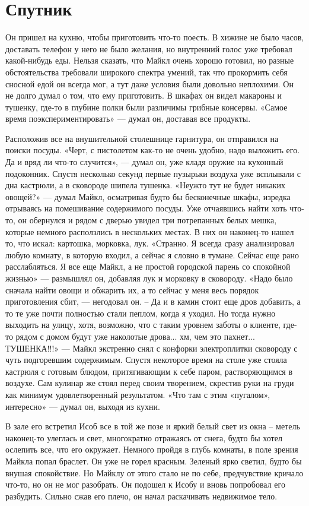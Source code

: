 \chapter{Спутник}
\lettrine{О}{}н пришел на кухню, чтобы приготовить что-то поесть. В хижине не было часов, доставать телефон у него не было желания, но внутренний голос уже требовал какой-нибудь еды. Нельзя сказать, что Майкл очень хорошо готовил, но разные обстоятельства требовали широкого спектра умений, так что прокормить себя сносной едой он всегда мог, а тут даже условия были довольно неплохими. Он не долго думал о том, что ему приготовить. В шкафах он видел макароны и тушенку, где-то в глубине полки были различимы грибные консервы. «Самое время поэкспериментировать» — думал он, доставая все продукты. 

Расположив все на внушительной столешнице гарнитура, он отправился на поиски посуды. «Черт, с пистолетом как-то не очень удобно, надо выложить его. Да и вряд ли что-то случится», — думал он, уже кладя оружие на кухонный подоконник. Спустя несколько секунд первые пузырьки воздуха уже всплывали с дна кастрюли, а в сковороде шипела тушенка. «Неужто тут не будет никаких овощей?» — думал Майкл, осматривая будто бы бесконечные шкафы, изредка отрываясь на помешивание содержимого посуды. Уже отчаявшись найти хоть что-то, он обернулся и рядом с дверью увидел три потрепанных белых мешка, которые немного расползлись в нескольких местах. В них он наконец-то нашел то, что искал: картошка, морковка, лук. «Странно. Я всегда сразу анализировал любую комнату, в которую входил, а сейчас я словно в тумане. Сейчас еще рано расслабляться. Я все еще Майкл, а не простой городской парень со спокойной жизнью» — размышлял он, добавляя лук и морковку в сковороду. «Надо было сначала найти овощи и обжарить их, а то сейчас у меня весь порядок приготовления сбит, — негодовал он. – Да и в камин стоит еще дров добавить, а то те уже почти полностью стали пеплом, когда я уходил. Но тогда нужно выходить на улицу, хотя, возможно, что с таким уровнем заботы о клиенте, где-то рядом с домом будут уже наколотые дрова... хм, чем это пахнет... ТУШЕНКА!!!» — Майкл экстренно снял с конфорки электроплитки сковороду с чуть подгоревшим содержимым. Спустя некоторое время на столе уже стояла кастрюля с готовым блюдом, притягивающим к себе паром, растворяющимся в воздухе. Сам кулинар же стоял перед своим творением, скрестив руки на груди как минимум удовлетворенный результатом. «Что там с этим «пугалом», интересно» — думал он, выходя из кухни.

В зале его встретил Исоб все в той же позе и яркий белый свет из окна – метель наконец-то улеглась и свет, многократно отражаясь от снега, будто бы хотел ослепить все, что его окружает. Немного пройдя в глубь комнаты, в поле зрения Майкла попал браслет. Он уже не горел красным. Зеленый ярко светил, будто бы внушая спокойствие. Но Майклу от этого стало не по себе, предчувствие кричало что-то, но он не мог разобрать. Он подошел к Исобу и вновь попробовал его разбудить. Сильно сжав его плечо, он начал раскачивать недвижимое тело.

